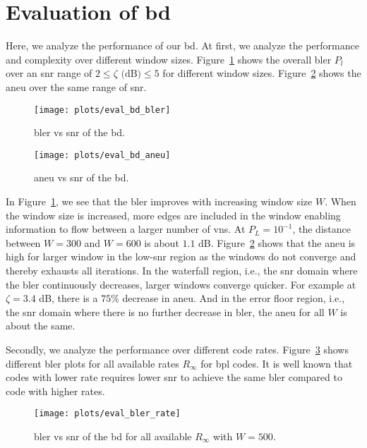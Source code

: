 \section{Evaluation of \texorpdfstring{\acrlong{bd}}{BD}}
Here, we analyze the performance of our \gls{bd}. At first, we analyze the performance and complexity over different window sizes. Figure~\ref{fig:eval_bd_bler} shows the overall \gls{bler} $P_l$ over an \gls{snr} range of $2\leq\zeta\text{ (dB)}\leq 5$ for different window sizes. Figure~\ref{fig:eval_bd_aneu} shows the \gls{aneu} over the same range of \gls{snr}.
\begin{figure}[htbp]
  \centering
  \texttt{[image: plots/eval\_bd\_bler]}
  \caption[\acrshort{bler} vs \acrshort{snr} of the \acrshort{bd} for $W=300$.]{\gls{bler} vs \gls{snr} of the \acrfull{bd}.}
  \label{fig:eval_bd_bler}
\end{figure}
\begin{figure}[htbp]
   \centering
  \texttt{[image: plots/eval\_bd\_aneu]}
  \caption[\acrshort{aneu} vs \acrshort{snr} of the \acrshort{bd} for $W=300$.]{\gls{aneu} vs \gls{snr} of the \acrfull{bd}.}
  \label{fig:eval_bd_aneu}
\end{figure}

In Figure~\ref{fig:eval_bd_bler}, we see that the \gls{bler} improves with increasing window size $W$. When the window size is increased, more edges are included in the window enabling information to flow between a larger number of \glspl{vn}. At $P_L=10^{-1}$, the distance between $W=300$ and $W=600$ is about $1.1$ dB. Figure~\ref{fig:eval_bd_aneu} shows that the \gls{aneu} is high for larger window in the low-\gls{snr} region as the windows do not converge and thereby exhausts all iterations. In the waterfall region, i.e., the \gls{snr} domain where the \gls{bler} continuously decreases, larger windows converge quicker. For example at $\zeta=3.4$ dB, there is a $75\%$ decrease in \gls{aneu}. And in the error floor region, i.e., the \gls{snr} domain where there is no further decrease in \gls{bler}, the \gls{aneu} for all $W$ is about the same.

Secondly, we analyze the performance over different code rates. Figure~\ref{fig:eval_bler_rate} shows different \gls{bler} plots for all available rates $R_\infty$ for \gls{bpl} codes. It is well known that codes with lower rate requires lower \gls{snr} to achieve the same \gls{bler} compared to code with higher rates.
\begin{figure}[htbp]
  \centering
  \texttt{[image: plots/eval\_bler\_rate]}
  \caption[\acrshort{bler} vs \acrshort{snr} of the \acrshort{bd} for all $R_\infty$.]{\gls{bler} vs \gls{snr} of the \acrfull{bd} for all available $R_\infty$ with $W=500$.}
  \label{fig:eval_bler_rate}
\end{figure}

